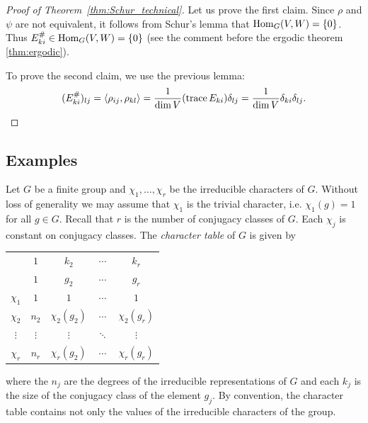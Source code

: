 \begin{proof}[Proof of Theorem~\ref{thm:Schur_technical}]
    Let us prove the first claim. Since 
    $\rho$ and $\psi$ 
    are not equivalent, it follows from Schur's lemma that $\operatorname{Hom}_G(V,W)=\{0\}$.
    Thus $E_{ki}^\#\in\operatorname{Hom}_G(V,W)=\{0\}$ (see the comment 
    before the ergodic theorem \ref{thm:ergodic}). 
    
    To prove the second claim, we use the previous lemma:
    \[
    (E_{ki}^\#)_{lj}=\langle\rho_{ij},\rho_{kl}\rangle
    =\frac{1}{\dim V}(\operatorname{trace} E_{ki})\delta_{lj}
    =\frac{1}{\dim V}\delta_{ki}\delta_{lj}.\qedhere
    \]
\end{proof}


\subsection{Examples}

Let $G$ be a finite group and $\chi_1,\dots,\chi_r$ be the irreducible characters of $G$. Without loss of generality
we may assume that $\chi_1$ is the trivial character, i.e. $\chi_1(g)=1$ for all $g\in G$. 
Recall that $r$ is the number of conjugacy classes of $G$. Each $\chi_j$ is constant on conjugacy classes. 
The \emph{character table} of 
$G$ is given by 
\begin{center}
\begin{tabular}{|c|cccc|}
\hline 
 & $1$ & $k_{2}$ & $\cdots$ & $k_{r}$\tabularnewline
 & $1$ & $g_{2}$ & $\cdots$ & $g_{r}$\tabularnewline
\hline 
$\chi_{1}$ & $1$ & $1$ & $\cdots$ & $1$\tabularnewline
$\chi_{2}$ & $n_{2}$ & $\chi_{2}(g_{2})$ & $\cdots$ & $\chi_{2}(g_{r})$\tabularnewline
$\vdots$ & $\vdots$ & $\vdots$ & $\ddots$ & $\vdots$\tabularnewline
$\chi_{r}$ & $n_{r}$ & $\chi_{r}(g_{2})$ & $\cdots$ & $\chi_{r}(g_{r})$\tabularnewline
\hline
\end{tabular}
\end{center}
where the $n_j$ are the degrees of the irreducible representations of $G$ and each $k_j$ is 
the size of the conjugacy class of the element $g_j$. By convention, the character table
contains not only the values of the irreducible characters of the group. 

